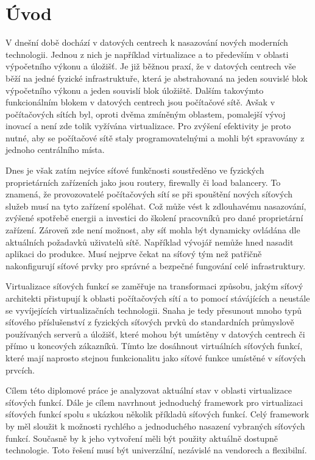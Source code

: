 
\chapter{Úvod}

V dnešní době dochází v datových centrech k nasazování nových moderních technologii. Jednou z nich je například virtualizace a to především v oblasti výpočetního výkonu a úložišť. Je již běžnou praxí, že v datových centrech vše běží na jedné fyzické infrastruktuře, která je abstrahovaná na jeden souvislé blok výpočetního výkonu a jeden souvislí blok úložiště. Dalším takovýmto funkcionálním blokem v datových centrech jsou počítačové sítě. Avšak v počítačových sítích byl, oproti dvěma zmíněným oblastem, pomalejší vývoj inovací a není zde tolik vyžívána virtualizace. Pro zvýšení efektivity je proto nutné, aby se počítačové sítě staly programovatelnými a mohli být spravovány z jednoho centrálního místa. 

Dnes je však zatím nejvíce síťové funkčnosti  soustředěno ve fyzických proprietárních zařízeních jako jsou routery, firewally či load balancery. To znamená, že provozovatelé počítačových sítí se při spouštění nových síťových služeb musí na tyto zařízení spoléhat. Což může vést k zdlouhavému nasazování, zvýšené spotřebě energii a investici do školení pracovníků pro dané proprietární zařízení. Zároveň zde není možnost, aby síť mohla být dynamicky ovládána dle aktuálních požadavků uživatelů sítě. Například vývojář nemůže hned nasadit aplikaci do produkce. Musí nejprve čekat na síťový tým než patřičně nakonfigurují síťové prvky pro správné a bezpečné fungování celé infrastruktury.

Virtualizace síťových funkcí se zaměřuje na transformaci způsobu, jakým síťový architekti přistupují k oblasti počítačových sítí a to pomocí stávájících a neustále se vyvíjejících virtualizačních technologii. Snaha je tedy přesunout mnoho typů síťového příslušenství z fyzických síťových prvků do standardních průmyslově používaných serverů a úložišť, které mohou být umístěny v datových centrech či přímo u koncových zákazníků. Tímto lze dosáhnout virtuálních síťových funkcí, které mají naprosto stejnou funkcionalitu jako síťové funkce umístěné v síťových prvcích.

Cílem této diplomové práce je analyzovat aktuální stav v oblasti virtualizace síťových funkcí. Dále je cílem navrhnout jednoduchý framework pro virtualizaci síťových funkcí spolu s ukázkou několik příkladů síťových funkcí. Celý framework by měl sloužit k možnosti rychlého a jednoduchého nasazení vybraných síťových funkcí. Současně by k jeho vytvoření měli být použity aktuálně dostupně technologie. Toto řešení musí být univerzální, nezávislé na vendorech a flexibilní.

